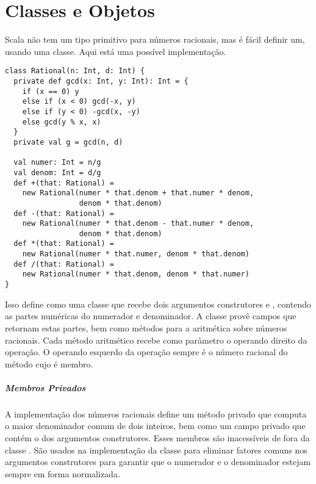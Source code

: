 \chapter{Classes e Objetos}
\label{chap:classes}

Scala n\~{a}o tem um tipo primitivo para n\'{u}meros racionais, mas \'{e} f\'{a}cil 
definir um, usando uma classe. Aqui est\'{a} uma poss\'{i}vel implementa\c{c}\~{a}o.

\begin{lstlisting}
class Rational(n: Int, d: Int) {
  private def gcd(x: Int, y: Int): Int = {
    if (x == 0) y
    else if (x < 0) gcd(-x, y)
    else if (y < 0) -gcd(x, -y)
    else gcd(y % x, x)
  }
  private val g = gcd(n, d)

  val numer: Int = n/g
  val denom: Int = d/g
  def +(that: Rational) =
    new Rational(numer * that.denom + that.numer * denom,
                 denom * that.denom)
  def -(that: Rational) =
    new Rational(numer * that.denom - that.numer * denom, 
                 denom * that.denom)
  def *(that: Rational) =
    new Rational(numer * that.numer, denom * that.denom)
  def /(that: Rational) =
    new Rational(numer * that.denom, denom * that.numer)
}
\end{lstlisting}

Isso define  como uma classe que recebe dois argumentos 
construtores  e , contendo as partes num\'{e}ricas do numerador
e denominador. A classe prov\^{e} campos que retornam estas partes, bem como
m\'{e}todos para a aritm\'{e}tica sobre n\'{u}meros racionais. Cada m\'{e}todo aritm\'{e}tico 
recebe como par\^{a}metro o operando direito da opera\c{c}\~{a}o. O operando esquerdo
da opera\c{c}\~{a}o sempre \'{e} o n\'{u}mero racional do m\'{e}todo cujo \'{e} membro.   

\paragraph{Membros Privados}
A implementa\c{c}\~{a}o dos n\'{u}meros racionais define um m\'{e}todo privado  que 
computa o maior denominador comum de dois inteiros, bem como um campo
privado  que cont\'{e}m o  dos argumentos construtores. Esses
membros s\~{a}o inacess\'{i}veis de fora da classe . S\~{a}o usados na 
implementa\c{c}\~{a}o da classe para eliminar fatores comuns nos argumentos construtores
para garantir que o numerador e o denominador estejam sempre em forma normalizada.    

